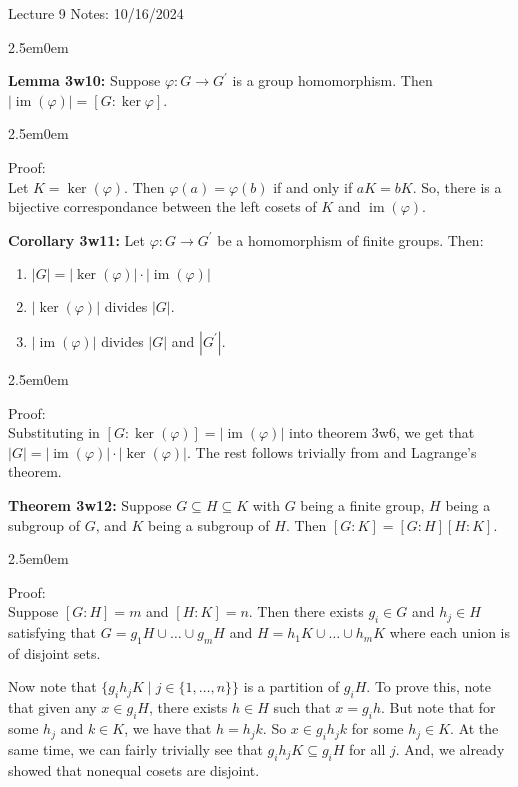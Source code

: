 \documentclass{book}
\newcommand{\hTwo}{%
\color{MidnightBlue}%
   \fontsize{13}{15}\selectfont%
}
\newcommand{\hThree}{%
   \color{PineGreen!85!Orange}
   \fontsize{12}{14}\selectfont%
}
\newenvironment{myIndent}{%
   \begin{adjustwidth}{2.5em}{0em}%
}{%
   \end{adjustwidth}%
}
\newcommand{\blab}[1]{\textbf{#1}}
\DeclareMathOperator{\im}{im}
\newcommand{\retTwo}{\hfill\bigbreak}
\newcommand{\mHeader}[1]{{
   \color{Black}%
   \fontsize{20}{18}\selectfont%
   #1\retTwo
}}
\begin{document}
\mHeader{Lecture 9 Notes: 10/16/2024}

\begin{myIndent}\hTwo
	\blab{Lemma 3w10:} Suppose $\varphi: G \longrightarrow G^\prime$ is a group homomorphism. Then\\ $|\im(\varphi)| = [G: \ker{\varphi}]$.
	
	\begin{myIndent}\hThree
		Proof:\\
		Let $K = \ker(\varphi)$. Then $\varphi(a) = \varphi(b)$ if and only if $aK = bK$. So, there is a\\ bijective correspondance between the left cosets of $K$ and $\im(\varphi)$.\retTwo
	\end{myIndent}

	\blab{Corollary 3w11:} Let $\varphi: G \longrightarrow G^\prime$ be a homomorphism of finite groups. Then:
	\begin{enumerate}
		\item $|G| = |\ker(\varphi)|\cdot |\im(\varphi)|$
		\item $|\ker(\varphi)|$ divides $|G|$.
		\item $|\im(\varphi)|$ divides $|G|$ and $|G^\prime|$.
	\end{enumerate}

	\begin{myIndent}\hThree
		Proof:\\
		Substituting in $[G: \ker(\varphi)] = |\im(\varphi)|$ into theorem 3w6, we get that\\ $|G| = |\im(\varphi)|\cdot |\ker(\varphi)|$. The rest follows trivially from and Lagrange's theorem.\newpage
	\end{myIndent}

	\blab{Theorem 3w12:} Suppose $G \subseteq H \subseteq K$ with $G$ being a finite group, $H$ being a subgroup of $G$, and $K$ being a subgroup of $H$. Then $[G:K] = [G:H][H:K]$.

	\begin{myIndent}\hThree
		Proof:\\
		Suppose $[G:H] = m$ and $[H:K] = n$. Then there exists $g_i \in G$ and $h_j \in H$ satisfying that $G = g_1H \cup \ldots \cup g_mH$ and $H = h_1K \cup \ldots \cup h_mK$ where each union is of disjoint sets.\retTwo

		Now note that $\{g_ih_jK \mid j \in \{1, \ldots, n\}\}$ is a partition of $g_iH$. To prove this, note that given any $x \in g_iH$, there exists $h \in H$ such that $x = g_ih$. But note that for some $h_j$ and $k \in K$, we have that $h = h_j k$. So $x \in g_ih_j k$ for some $h_j \in K$. At the same time, we can fairly trivially see that $g_ih_jK \subseteq g_iH$ for all $j$. And, we already showed that nonequal cosets are disjoint.\retTwo


\end{myIndent}
\end{myIndent}
\end{document}
